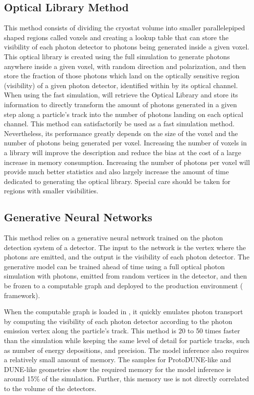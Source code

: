 \documentclass[../main-v1.tex]{subfiles}
\begin{document}
\subsection{Optical Library Method}
This method consists of dividing the cryostat volume into smaller parallelepiped shaped regions called voxels and creating a lookup table that can store the visibility of each photon detector to photons being generated inside a given voxel.
This optical library is created using the full  simulation to generate photons anywhere inside a given voxel, with random direction and polarization, and then store the fraction of those photons which land on the optically sensitive region (visibility) of a given photon detector, identified within   by its optical channel. When using the fast simulation,   will retrieve the Optical Library and store its information to directly transform the amount of photons generated in a given step along a particle's track into the number of photons landing on each optical channel.
This method can satisfactorily be used as a fast simulation method. Nevertheless, its performance greatly depends on the size of the voxel and the number of photons being generated per voxel. Increasing the number of voxels in a library will improve the description and reduce the bias at the cost of a large increase in memory consumption. Increasing the number of photons per voxel will provide much better statistics and also largely increase the amount of time dedicated to generating the optical library. Special care should be taken for regions with smaller visibilities.

\subsection{Generative Neural Networks}
This method relies on a generative neural network  trained on the photon detection system of a detector. The input to the network is the vertex where the photons are emitted, and the output is the visibility of each photon detector.
The generative model can be trained ahead of time using a full   optical photon simulation with photons, emitted from random vertices in the detector, and then be frozen to a computable graph and deployed to the production environment (  framework).

When the computable graph is loaded in , it quickly emulates photon transport by  computing the visibility of each photon detector according to the photon emission vertex along the particle’s track.
This method is 20 to 50 times faster than the  simulation while keeping the same level of detail for particle tracks, such as number of energy depositions, and precision.
The model inference also requires a relatively small amount of memory. The samples for ProtoDUNE-like and DUNE-like geometries show the required memory for the model inference is around 15\% of the  simulation. Further, this memory use is not directly correlated to the volume of the detectors.
\end{document}
